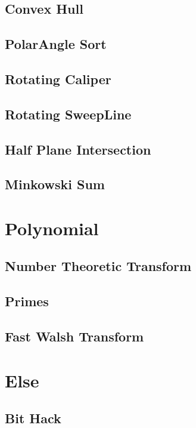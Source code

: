 \subsection{Convex Hull}

\subsection{PolarAngle Sort}

\subsection{Rotating Caliper}

\subsection{Rotating SweepLine}

\subsection{Half Plane Intersection}

\subsection{Minkowski Sum}


\section{Polynomial}
\subsection{Number Theoretic Transform}

\subsection{Primes}

\subsection{Fast Walsh Transform}


\section{Else}
\subsection{Bit Hack}

